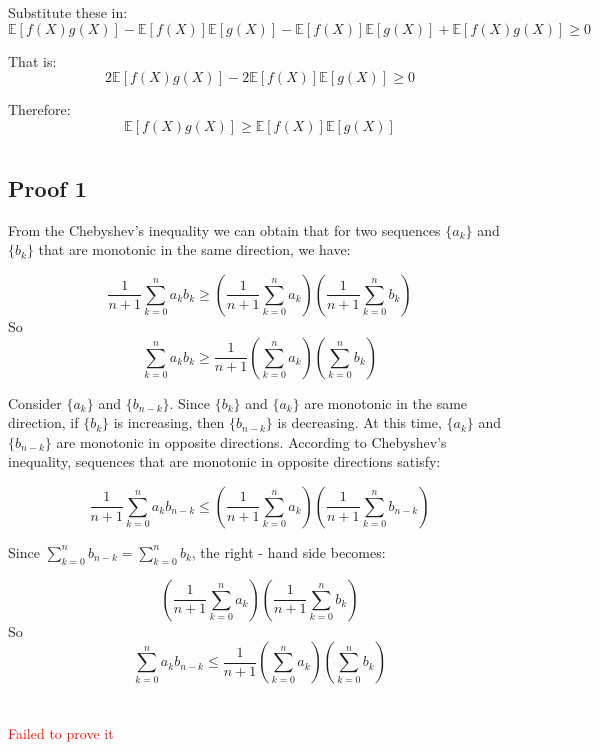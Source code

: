 \documentclass{article}
\begin{document}
Substitute these in:
$$\mathbb{E}[f(X)g(X)]-\mathbb{E}[f(X)]\mathbb{E}[g(X)]-\mathbb{E}[f(X)]\mathbb{E}[g(X)]+\mathbb{E}[f(X)g(X)] \geq 0$$

That is:
$$
2\mathbb{E}[f(X)g(X)] - 2\mathbb{E}[f(X)]\mathbb{E}[g(X)] \geq 0
$$

Therefore:
$$
\mathbb{E}[f(X)g(X)] \geq \mathbb{E}[f(X)]\mathbb{E}[g(X)]
$$

\section{}

\subsection*{Proof 1} 

From the Chebyshev's inequality we can obtain that for two sequences $\{a_k\}$ and $\{b_k\}$ that are monotonic in the same direction, we have:

$$
\frac{1}{n + 1}\sum_{k = 0}^{n}a_kb_k\geq\left(\frac{1}{n + 1}\sum_{k = 0}^{n}a_k\right)\left(\frac{1}{n + 1}\sum_{k = 0}^{n}b_k\right)
$$
So
$$
\sum_{k = 0}^{n}a_kb_k\geq\frac{1}{n + 1}\left(\sum_{k = 0}^{n}a_k\right)\left(\sum_{k = 0}^{n}b_k\right)
$$

Consider $\{a_k\}$ and $\{b_{n - k}\}$. Since  $\{b_k\}$ and $\{a_k\}$ are monotonic in the same direction, if $\{b_k\}$ is increasing, then $\{b_{n - k}\}$ is decreasing. At this time, $\{a_k\}$ and $\{b_{n - k}\}$ are monotonic in opposite directions. According to Chebyshev's inequality, sequences that are monotonic in opposite directions satisfy:

$$
\frac{1}{n + 1}\sum_{k = 0}^{n}a_kb_{n - k}\leq\left(\frac{1}{n + 1}\sum_{k = 0}^{n}a_k\right)\left(\frac{1}{n + 1}\sum_{k = 0}^{n}b_{n - k}\right)
$$

Since $\sum_{k = 0}^{n}b_{n - k}=\sum_{k = 0}^{n}b_k$, the right - hand side becomes:

$$\left(\frac{1}{n + 1}\sum_{k = 0}^{n}a_k\right)\left(\frac{1}{n + 1}\sum_{k = 0}^{n}b_k\right)
$$
So
$$\sum_{k = 0}^{n}a_kb_{n - k}\leq\frac{1}{n + 1}\left(\sum_{k = 0}^{n}a_k\right)\left(\sum_{k = 0}^{n}b_k\right)$$

\section{}

\textcolor{red}{Failed to prove it}
\end{document}
